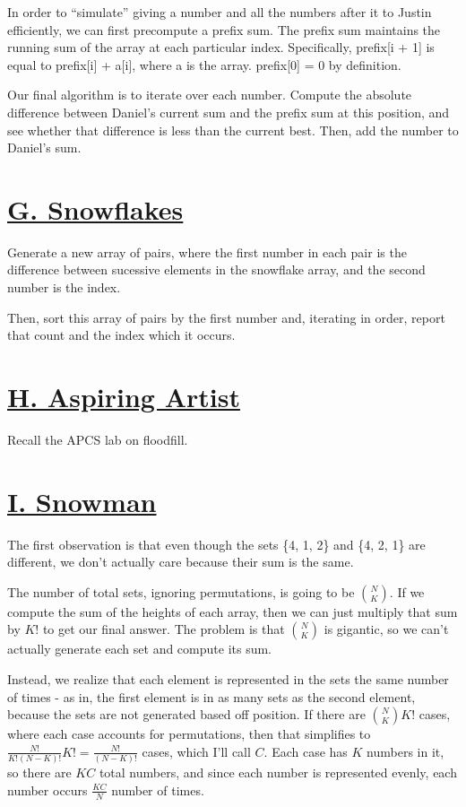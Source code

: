 \documentclass[11pt, oneside]{article}
\begin{document}
In order to ``simulate'' giving a number and all the numbers after it to Justin
efficiently, we can first precompute a prefix sum. The prefix sum maintains
the running sum of the array at each particular index. Specifically,
prefix[i + 1] is equal to prefix[i] + a[i], where a is the array.
prefix[0] = 0 by definition.

Our final algorithm is to iterate over each number. Compute the absolute difference between Daniel's current sum and the prefix sum at this position, and see whether
that difference is less than the current best. Then, add the number to Daniel's sum.

\section{\href{https://codeforces.com/group/XaPbwwWypc/contest/275182/problem/G}{G. Snowflakes}}

Generate a new array of pairs, where the first number in each pair is the difference between sucessive elements in the snowflake array, and the second number is the index.

Then, sort this array of pairs by the first number and, iterating in order,
report that count and the index which it occurs.

\section{\href{https://codeforces.com/group/XaPbwwWypc/contest/275182/problem/H}{H. Aspiring Artist}}

Recall the APCS lab on floodfill.

\section{\href{https://codeforces.com/group/XaPbwwWypc/contest/275182/problem/I}{I. Snowman}}

The first observation is that even though the sets \{4, 1, 2\} and \{4, 2, 1\}
are different, we don't actually care because their sum is the same.

The number of total sets, ignoring permutations, is going to be \( N \choose K \). If we compute the
sum of the heights of each array, then we can just multiply that sum by
\( K! \) to get our final answer. The problem is that \( N \choose K \) is gigantic,
so we can't actually generate each set and compute its sum.

Instead, we realize that each element is represented in the sets the same number of times - as in, the first element is in as many sets as the second element, because
the sets are not generated based off position. If there are \( {N \choose K} K! \) cases, where each case accounts for permutations, then that simplifies to \( \frac{N!}{K!(N - K)!} K! = \frac{N!}{(N - K)!} \) cases, which I'll call \( C \). Each case has \( K \)
numbers in it, so there are \( KC \) total numbers, and since each number is represented evenly, each number occurs \( \frac{KC}{N} \) number of times.
\end{document}
